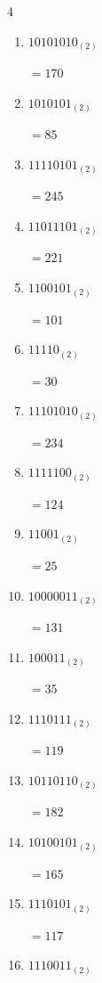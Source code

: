 \begin{multicols}{4}
\begin{enumerate}
        $=26$

  \item $10101010_{(2)}$

        $=170$

  \item $1010101_{(2)}$

        $=85$

  \item $11110101_{(2)}$

        $=245$

  \item $11011101_{(2)}$

        $=221$

  \item $1100101_{(2)}$

        $=101$

  \item $11110_{(2)}$

        $=30$

\columnbreak %

  \item $11101010_{(2)}$

        $=234$

  \item $1111100_{(2)}$

        $=124$

  \item $11001_{(2)}$

        $=25$

  \item $10000011_{(2)}$

        $=131$

  \item $100011_{(2)}$

        $=35$

  \item $1110111_{(2)}$

        $=119$

  \item $10110110_{(2)}$

        $=182$

  \item $10100101_{(2)}$

        $=165$

  \item $1110101_{(2)}$

        $=117$

  \item $1110011_{(2)}$


\end{enumerate}
\end{multicols}
